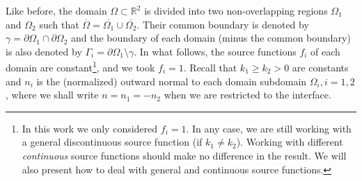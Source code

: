 Like before, the domain \(\Omega \subset \mathbb{R}^2\) is divided into two non-overlapping regions \(\Omega_1\) and \(\Omega_2\) such that \(\overline{\Omega} = \overline{\Omega_1} \cup \overline{\Omega_2}\). Their common boundary is denoted by \(\gamma = \partial\Omega_1 \cap \partial\Omega_2\) and the boundary of each domain (minus the common boundary) is also denoted by \(\Gamma_i = \partial\Omega_1\setminus{\gamma}\). In what follows, the source functions \(f_i\) of each domain are constant\footnote{In this work we only considered \(f_i=1\). In any case, we are still working with a general discontinuous source function (if \(k_1 \neq k_2\)). Working with different \textit{continuous} source functions should make no difference in the result. We will also present how to deal with general and continuous source functions.}, and we took \(f_i = 1\). Recall that \(k_1 \geq k_2 > 0\) are constants and \(n_i\) is the (normalized) outward normal to each domain subdomain \(\Omega_i, i=1, 2\), where we shall write \(n=n_1=-n_2\) when we are restricted to the interface.

